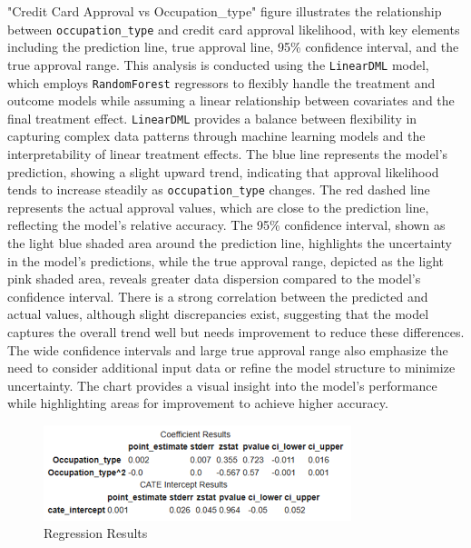 \documentclass[12pt]{report}
\begin{document}
    "Credit Card Approval vs Occupation\_type" figure illustrates the relationship between \texttt{occupation\_type} and credit card approval likelihood, with key elements including the prediction line, true approval line, 95\% confidence interval, and the true approval range. This analysis is conducted using the \texttt{LinearDML} model, which employs \texttt{RandomForest} regressors to flexibly handle the treatment and outcome models while assuming a linear relationship between covariates and the final treatment effect. \texttt{LinearDML} provides a balance between flexibility in capturing complex data patterns through machine learning models and the interpretability of linear treatment effects. The blue line represents the model's prediction, showing a slight upward trend, indicating that approval likelihood tends to increase steadily as \texttt{occupation\_type} changes. The red dashed line represents the actual approval values, which are close to the prediction line, reflecting the model's relative accuracy. The 95\% confidence interval, shown as the light blue shaded area around the prediction line, highlights the uncertainty in the model's predictions, while the true approval range, depicted as the light pink shaded area, reveals greater data dispersion compared to the model's confidence interval. There is a strong correlation between the predicted and actual values, although slight discrepancies exist, suggesting that the model captures the overall trend well but needs improvement to reduce these differences. The wide confidence intervals and large true approval range also emphasize the need to consider additional input data or refine the model structure to minimize uncertainty. The chart provides a visual insight into the model's performance while highlighting areas for improvement to achieve higher accuracy.

    \begin{figure}[h!]
        \centering
        \includegraphics[width=0.8\textwidth]{resources/pic/regression results.png}
        \caption{Regression Results}
        \label{fig:Regression Results}
    \end{figure}
\end{document}
